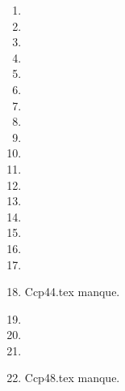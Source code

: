 \begin{enumerate}
  \item  
  \item  
  \item  
  \item  
  \item  
  \item  
  \item  
  \item  
  \item  
  \item  
  \item  
  \item  
  \item  
  \item  
  \item  
  \item  
  \item  
  \item Ccp44.tex manque. 
  \item  
  \item  
  \item  
  \item Ccp48.tex manque. 
\end{enumerate} 
